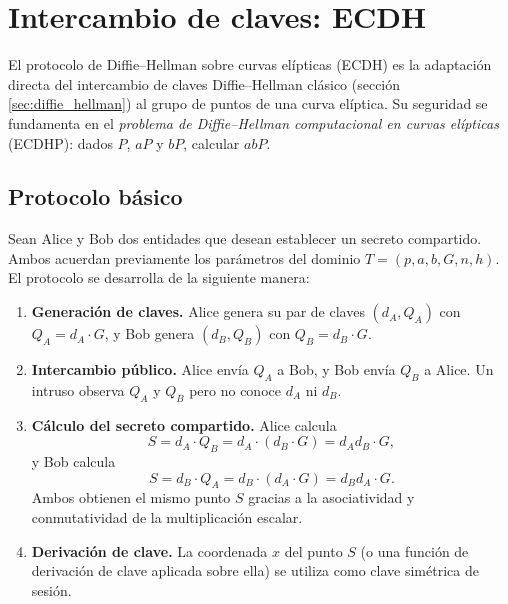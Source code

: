 \section{Intercambio de claves: ECDH}
\label{sec:ecdh}

El protocolo de Diffie--Hellman sobre curvas elípticas (ECDH) es la adaptación directa del intercambio de claves Diffie--Hellman clásico (sección \ref{sec:diffie_hellman}) al grupo de puntos de una curva elíptica. Su seguridad se fundamenta en el \emph{problema de Diffie--Hellman computacional en curvas elípticas} (ECDHP): dados $P$, $aP$ y $bP$, calcular $abP$.

\subsection{Protocolo básico}
\label{subsec:ecdh-protocolo}

Sean Alice y Bob dos entidades que desean establecer un secreto compartido. Ambos acuerdan previamente los parámetros del dominio $T = (p, a, b, G, n, h)$. El protocolo se desarrolla de la siguiente manera:

\begin{enumerate}
    \item \textbf{Generación de claves.} Alice genera su par de claves $(d_A, Q_A)$ con $Q_A = d_A \cdot G$, y Bob genera $(d_B, Q_B)$ con $Q_B = d_B \cdot G$.
    \item \textbf{Intercambio público.} Alice envía $Q_A$ a Bob, y Bob envía $Q_B$ a Alice. Un intruso observa $Q_A$ y $Q_B$ pero no conoce $d_A$ ni $d_B$.
    \item \textbf{Cálculo del secreto compartido.} Alice calcula
    \[
        S = d_A \cdot Q_B = d_A \cdot (d_B \cdot G) = d_A d_B \cdot G,
    \]
    y Bob calcula
    \[
        S = d_B \cdot Q_A = d_B \cdot (d_A \cdot G) = d_B d_A \cdot G.
    \]
    Ambos obtienen el mismo punto $S$ gracias a la asociatividad y conmutatividad de la multiplicación escalar.
    \item \textbf{Derivación de clave.} La coordenada $x$ del punto $S$ (o una función de derivación de clave aplicada sobre ella) se utiliza como clave simétrica de sesión.
\end{enumerate}

